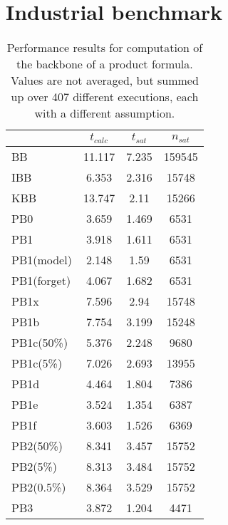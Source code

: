 \section{Industrial benchmark}
\label{sec:sectionVonThore}

\begin{wraptable}[29]{r}{7cm}
\begin{tabular}{l| c c c }
&$t_{calc}$ & $t_{sat}$& $n_{sat}$ \\
\hline
BB & 11.117 & 7.235 & 159545 \\
IBB & 6.353 & 2.316 & 15748 \\
KBB & 13.747 & 2.11 & 15266 \\
PB0 & 3.659 & 1.469 & 6531 \\
PB1 & 3.918 & 1.611 & 6531 \\
PB1(model) & 2.148 & 1.59 & 6531 \\
PB1(forget) & 4.067 & 1.682 & 6531 \\
PB1x & 7.596 & 2.94 & 15748 \\
PB1b & 7.754 & 3.199 & 15248 \\ %
PB1c(50\%) & 5.376 & 2.248 & 9680 \\
PB1c(5\%) & 7.026 & 2.693 & 13955 \\
PB1d & 4.464 & 1.804 & 7386 \\
PB1e & 3.524 & 1.354 & 6387 \\
PB1f & 3.603 & 1.526 & 6369 \\
PB2(50\%) & 8.341 & 3.457 & 15752 \\
PB2(5\%) & 8.313 & 3.484 & 15752 \\
PB2(0.5\%) & 8.364 & 3.529 & 15752 \\
PB3 & 3.872 & 1.204 & 4471 \\
\end{tabular}
\caption{Performance results for computation of the backbone of a product formula. Values are not averaged, but summed up over 407 different executions, each with a different assumption.}
\label{tab:vonThore1}
\end{wraptable}

